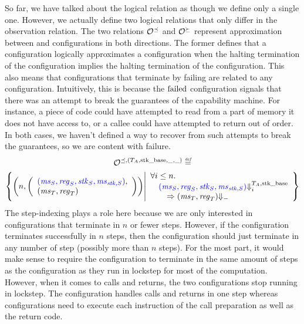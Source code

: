 \begin{jversion}
So far, we have talked about the logical relation as though we define only a single one.
However, we actually define two logical relations that only differ in the observation relation.
The two relations $\lro[\preceq]$ and $\lro[\succeq]$ represent approximation between \srccm{} and \trgcm{} configurations in both directions.
The former defines that a \srccm{} configuration logically approximates a \trgcm{} configuration when the halting termination of the \srccm{} configuration implies the halting termination of the \trgcm{} configuration.
This also means that \srccm{} configurations that terminate by failing are related to any \trgcm{} configuration.
Intuitively, this is because the $\failed$ configuration signals that there was an attempt to break the guarantees of the capability machine.
For instance, a piece of code could have attempted to read from a part of memory it does not have access to, or a callee could have attempted to return out of order.
In both cases, we haven't defined a way to recover from such attempts to break the guarantees, so we are content with failure.
\begin{multline*}
  \lro[\preceq,(\ta,\stkb,\_,\_)] \defeq \\\left\{ \npair{\left(\array{l}\src{(\ms_S,\reg_S,\stk_S,\ms_{\stk,S})},\\(\ms_T,\reg_T)\endarray\right)} \middle|
    \begin{array}{l}
      \forall i \leq n \ldotp \\
      \quad \src{(\ms_S,\reg_S,\stk_S,\ms_{\stk,S})} \sterm[i]{\ta,\stkb} \\\qquad\Rightarrow (\ms_T,\reg_T) \term\\
    \end{array}
\right\}
\end{multline*}
The step-indexing plays a role here because we are only interested in \srccm{} configurations that terminate in $n$ or fewer steps.
However, if the \srccm{} configuration terminates successfully in $n$ steps, then the \trgcm{} configuration should just terminate in any number of step (possibly more than $n$ steps).
For the most part, it would make sense to require the \trgcm{} configuration to terminate in the same amount of steps as the \srccm{} configuration as they run in lockstep for most of the computation.
However, when it comes to calls and returns, the two configurations stop running in lockstep.
The \srccm{} configuration handles calls and returns in one step whereas \trgcm{} configurations need to execute each instruction of the call preparation as well as the return code.


\end{jversion}
